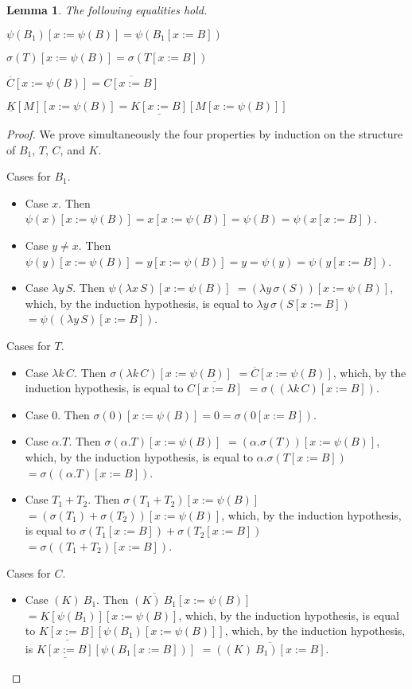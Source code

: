 \documentclass{LMCS}
\newtheorem{lemma}[theorem]{Lemma}
\begin{document}
\begin{lemma}\label{lem:substitution-lemma}
  The following equalities hold.
  \begin{myenumerate}
    \item $\psi(B_{1})[x:=\psi(B)]=\psi(B_{1}[x:=B])$
    \item $\sigma(T)[x:=\psi(B)]=\sigma(T[x:=B])$
    \item $\overline{C}[x:=\psi(B)]=\overline{C[x:=B]}$
    \item $\underline{K}[M][x:=\psi(B)]=\underline{K[x:=B]}[M[x:=\psi(B)]]$
  \end{myenumerate}
\end{lemma}
\begin{proof}
  We prove simultaneously the four properties by induction on the structure of $B_{1}$, $T$, $C$, and $K$.
  \begin{myenumerate}
    \item Cases for $B_{1}$.
      \begin{itemize}
	\item Case $x$. Then $\psi(x)[x:=\psi(B)]=x[x:=\psi(B)]=\psi(B)=\psi(x[x:=B])$.
	\item Case $y\neq x$. Then $\psi(y)[x:=\psi(B)]=y[x:=\psi(B)]=y=\psi(y)=\psi(y[x:=B])$.
	\item Case $\lambda y\,S$. Then 
	  $\psi(\lambda x\,S)[x:=\psi(B)]$
	  $=(\lambda y\,\sigma(S))[x:=\psi(B)]$,
	  which, by the induction hypothesis, is equal to
	  $\lambda y\,\sigma(S[x:=B])$
	  $=\psi((\lambda y\,S)[x:=B])$.
      \end{itemize}
    \item Cases for $T$.
      \begin{itemize}
	\item Case $\lambda k\,C$. Then 
	  $\sigma(\lambda k\,C)[x:=\psi(B)]$
	  $=\overline{C}[x:=\psi(B)]$,
	  which, by the induction hypothesis, is equal to
	  $\overline{C[x:=B]}$
	  $=\sigma((\lambda k\,C)[x:=B])$.

	\item Case $0$. Then $\sigma(0)[x:=\psi(B)]=0=\sigma(0[x:=B])$.
	\item Case $\alpha.T$. Then 
	  $\sigma(\alpha.T)[x:=\psi(B)]$
	  $=(\alpha.\sigma(T))[x:=\psi(B)]$,
	  which, by the induction hypothesis, is equal to
	  $\alpha.\sigma(T[x:=B])$
	  $=\sigma((\alpha.T)[x:=B])$.

	\item Case $T_{1}+T_{2}$. Then 
	  $\sigma(T_{1}+T_{2})[x:=\psi(B)]$
	  $=(\sigma(T_{1})+\sigma(T_{2}))[x:=\psi(B)]$,
	  which, by the induction hypothesis, is equal to
	  $\sigma(T_{1}[x:=B])+\sigma(T_{2}[x:=B])$
	  $=\sigma((T_{1}+T_{2})[x:=B])$.
      \end{itemize}
    \item Cases for $C$.
      \begin{itemize}
	\item Case $(K)~B_{1}$. Then 
	  $\overline{(K)~B_{1}}[x:=\psi(B)]$
	  $=\underline{K}[\psi(B_{1})][x:=\psi(B)]$,
	  which, by the induction hypothesis, is equal to
	  $\underline{K[x:=B]}[\psi(B_{1})[x:=\psi(B)]]$,
	  which, by the induction hypothesis, is 
	  $\underline{K[x:=B]}[\psi(B_{1}[x:=B])]$
	  $=\overline{((K)~B_{1})[x:=B]}$.


\end{itemize}
\end{myenumerate}
\end{proof}
\end{document}
